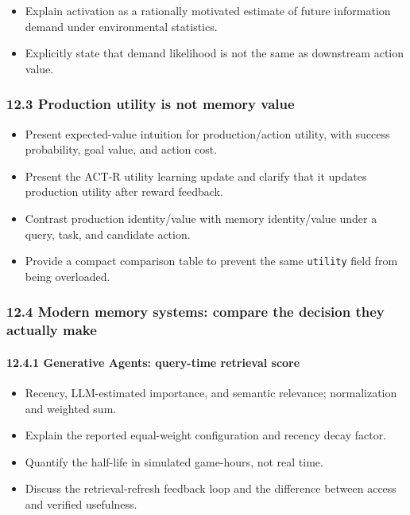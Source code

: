 \begin{itemize}
\tightlist
\item
  Explain activation as a rationally motivated estimate of future information demand under environmental statistics.
\item
  Explicitly state that demand likelihood is not the same as downstream action value.
\end{itemize}

\subsubsection{12.3 Production utility is not memory value}\label{123-production-utility-is-not-memory-value}

\begin{itemize}
\tightlist
\item
  Present expected-value intuition for production/action utility, with success probability, goal value, and action cost.
\item
  Present the ACT-R utility learning update and clarify that it updates production utility after reward feedback.
\item
  Contrast production identity/value with memory identity/value under a query, task, and candidate action.
\item
  Provide a compact comparison table to prevent the same \texttt{utility} field from being overloaded.
\end{itemize}

\subsubsection{12.4 Modern memory systems: compare the decision they actually make}\label{124-modern-memory-systems-compare-the-decision-they-actually-make}

\paragraph{12.4.1 Generative Agents: query-time retrieval score}\label{1241-generative-agents-query-time-retrieval-score}

\begin{itemize}
\tightlist
\item
  Recency, LLM-estimated importance, and semantic relevance; normalization and weighted sum.
\item
  Explain the reported equal-weight configuration and recency decay factor.
\item
  Quantify the half-life in simulated game-hours, not real time.
\item
  Discuss the retrieval-refresh feedback loop and the difference between access and verified usefulness.
\end{itemize}

